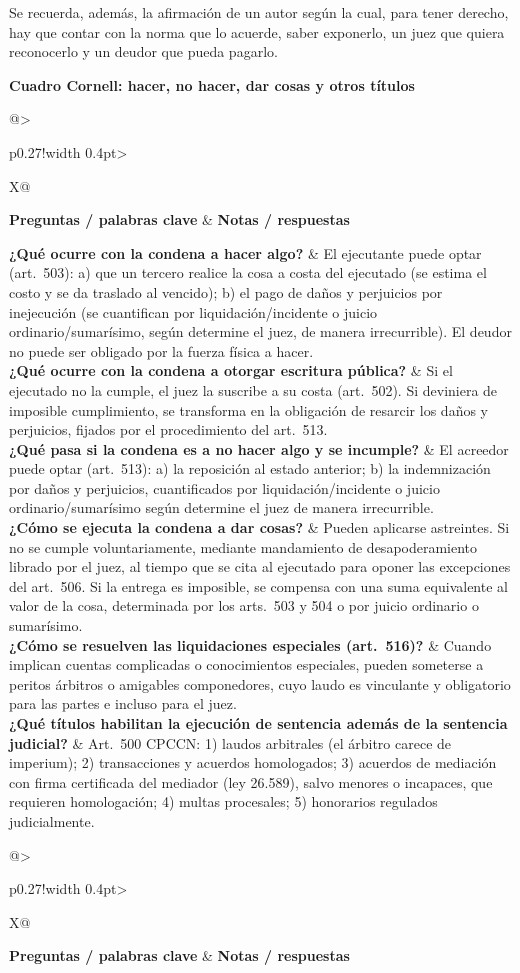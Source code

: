 \documentclass[12pt,oneside]{book}
\makeatletter
\newcommand{\cornelltitle}[1]{\par\bigskip\noindent\textbf{\sffamily Cuadro Cornell: #1}\par\nopagebreak\smallskip}
\newcommand{\cqrow}[2]{\textbf{#1} & #2 \\[0.5em]}
\newcommand{\cornellblock}[1]{%
  \noindent\begin{tabularx}{\textwidth}{@{}>{\raggedright\arraybackslash}p{0.27\textwidth}!{\vrule width 0.4pt}>{\raggedright\arraybackslash}X@{}}
  \toprule
  \textbf{Preguntas / palabras clave} & \textbf{Notas / respuestas} \\
  \midrule
  #1
  \bottomrule
  \end{tabularx}\par}
\makeatother
\begin{document}
Se recuerda, además, la afirmación de un autor según la cual, para tener derecho, hay que contar con la norma que lo acuerde, saber exponerlo, un juez que quiera reconocerlo y un deudor que pueda pagarlo.

\cornelltitle{hacer, no hacer, dar cosas y otros títulos}
\cornellblock{
\cqrow{¿Qué ocurre con la condena a hacer algo?}{El ejecutante puede optar (art.~503): a) que un tercero realice la cosa a costa del ejecutado (se estima el costo y se da traslado al vencido); b) el pago de daños y perjuicios por inejecución (se cuantifican por liquidación/incidente o juicio ordinario/sumarísimo, según determine el juez, de manera irrecurrible). El deudor no puede ser obligado por la fuerza física a hacer.
}
\cqrow{¿Qué ocurre con la condena a otorgar escritura pública?}{Si el ejecutado no la cumple, el juez la suscribe a su costa (art.~502). Si deviniera de imposible cumplimiento, se transforma en la obligación de resarcir los daños y perjuicios, fijados por el procedimiento del art.~513.
}
\cqrow{¿Qué pasa si la condena es a no hacer algo y se incumple?}{El acreedor puede optar (art.~513): a) la reposición al estado anterior; b) la indemnización por daños y perjuicios, cuantificados por liquidación/incidente o juicio ordinario/sumarísimo según determine el juez de manera irrecurrible.
}
\cqrow{¿Cómo se ejecuta la condena a dar cosas?}{Pueden aplicarse astreintes. Si no se cumple voluntariamente, mediante mandamiento de desapoderamiento librado por el juez, al tiempo que se cita al ejecutado para oponer las excepciones del art.~506. Si la entrega es imposible, se compensa con una suma equivalente al valor de la cosa, determinada por los arts.~503 y 504 o por juicio ordinario o sumarísimo.
}
\cqrow{¿Cómo se resuelven las liquidaciones especiales (art.~516)?}{Cuando implican cuentas complicadas o conocimientos especiales, pueden someterse a peritos árbitros o amigables componedores, cuyo laudo es vinculante y obligatorio para las partes e incluso para el juez.
}
\cqrow{¿Qué títulos habilitan la ejecución de sentencia además de la sentencia judicial?}{Art.~500 CPCCN: 1) laudos arbitrales (el árbitro carece de imperium); 2) transacciones y acuerdos homologados; 3) acuerdos de mediación con firma certificada del mediador (ley 26.589), salvo menores o incapaces, que requieren homologación; 4) multas procesales; 5) honorarios regulados judicialmente.
}
}
\medskip
\cornellblock{

}
\nopagebreak
\end{document}
